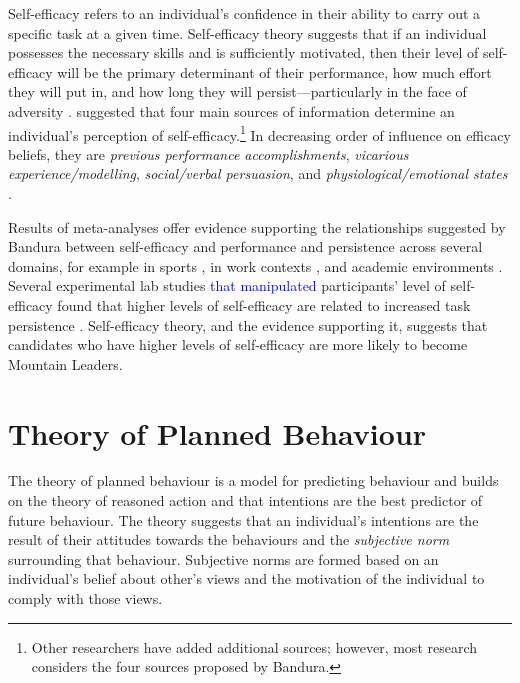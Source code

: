 \documentclass[
  12pt,
  a4paper,
]{book}
\begin{document}
Self-efficacy refers to an individual's confidence in their ability to carry out a specific task at a given time. Self-efficacy theory suggests that if an individual possesses the necessary skills and is sufficiently motivated, then their level of self-efficacy will be the primary determinant of their performance, how much effort they will put in, and how long they will persist---particularly in the face of adversity \citep{Bandura1977, Bandura1982, Bandura1997}. \citet{Bandura1982} suggested that four main sources of information determine an individual's perception of self-efficacy.\footnote{Other researchers \citep[e.g.,][]{Maddux1995} have added additional sources; however, most research considers the four sources proposed by Bandura.} In decreasing order of influence on efficacy beliefs, they are \emph{previous performance accomplishments}, \emph{vicarious experience/modelling}, \emph{social/verbal persuasion}, and \emph{physiological/emotional states} \citep[cf.~][]{Bandura1982, Samson2011}.

Results of meta-analyses offer evidence supporting the relationships suggested by Bandura between self-efficacy and performance and persistence across several domains, for example in sports \citep{Moritz2000}, in work contexts \citep{Stajkovic1998}, and academic environments \citep{Multon1991}. Several experimental lab studies \textcolor{blue}{that manipulated} participants' level of self-efficacy found that higher levels of self-efficacy are related to increased task persistence \citep{Hutchinson2008, Tenenbaum2001, Weinberg1979, Weinberg1980, Weinberg1981}. Self-efficacy theory, and the evidence supporting it, suggests that candidates who have higher levels of self-efficacy are more likely to become Mountain Leaders.

\hypertarget{gen-intro-social-tpb}{%
\section{Theory of Planned Behaviour}\label{gen-intro-social-tpb}}

The theory of planned behaviour \citep{Ajzen1991, Ajzen1986} is a model for predicting behaviour and builds on the theory of reasoned action \citep{Ajzen1980} and that intentions are the best predictor of future behaviour. The theory suggests that an individual's intentions are the result of their attitudes towards the behaviours and the \emph{subjective norm} surrounding that behaviour. Subjective norms are formed based on an individual's belief about other's views and the motivation of the individual to comply with those views.
\end{document}

